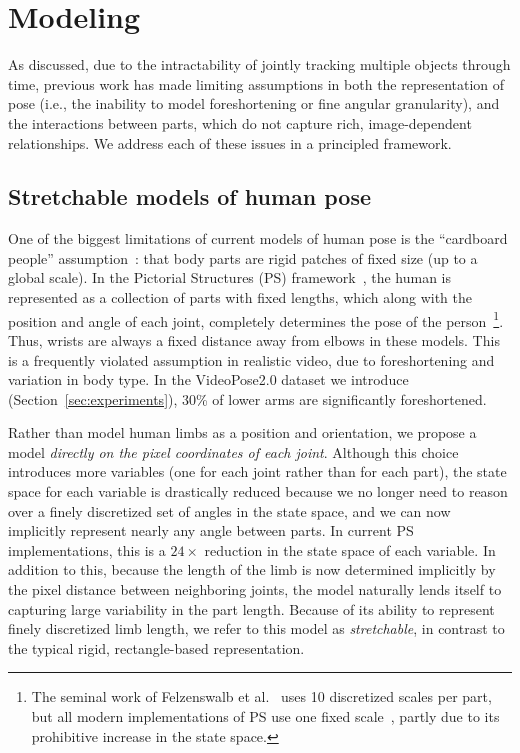 \section{Modeling}\label{sec:model}
As discussed, due to the intractability of jointly tracking multiple objects through time, previous 
work has made limiting assumptions in both the representation of pose (i.e., 
the inability to model foreshortening or fine angular granularity), and the 
interactions between parts, which do not capture rich, image-dependent 
relationships.  We address each of these issues in a principled framework.

\subsection{Stretchable models of human pose}  One of the biggest limitations 
of current models of human pose is the ``cardboard people'' 
assumption~\cite{cardboard02}: that body parts are rigid patches of fixed size 
(up to a global scale).  In the Pictorial Structures (PS) framework~\cite{felzps}, the human is represented as a collection of parts with fixed lengths, 
which along with the position and angle of each joint, completely determines 
the pose of the person~\footnote{The seminal work of Felzenswalb et 
al.~\cite{felzps} uses 10 discretized scales per part, 
but all modern implementations of PS use one fixed scale~\cite{sapp2010cascades,ferrari08,andriluka09}, partly due to its prohibitive 
increase in the state space.}.  Thus, wrists are always a fixed distance away 
from elbows in these models. This is a frequently violated assumption in 
realistic video, due to foreshortening and variation in body type.  In the VideoPose2.0 dataset we  
introduce (Section~\ref{sec:experiments}), 30\% of lower arms 
are significantly foreshortened.

 Rather than model human limbs as a position 
and orientation, we propose a model {\em directly on the pixel coordinates of 
each joint}.  Although this choice introduces more variables 
(one for each joint rather than for each part), the state space for each 
variable is drastically reduced because we no longer need to reason over a 
finely discretized set of angles in the state space, and we can now implicitly 
represent nearly any angle between parts.  In current PS implementations, this is a 
$24\times$ reduction in the state space of each variable.  In addition to 
this, because the length of the limb is now determined implicitly by the pixel 
distance between neighboring joints, the model naturally lends itself to 
capturing large variability in the part length.  Because of its ability to 
represent finely discretized limb length, we refer to this model as
{\em stretchable}, in contrast to the typical rigid, rectangle-based 
representation.

